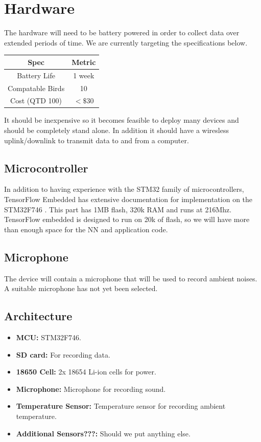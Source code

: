 \documentclass[12pt,journal,compsoc]{IEEEtran}
\begin{document}
\section{Hardware}
The hardware will need to be battery powered in order to collect data over extended periods of time. We are currently targeting the specifications below.

\begin{center}
\begin{tabular}{ c | c }
Spec             & Metric\\ 
\hline 
Battery Life     & 1 week\\
Compatable Birds & 10    \\
Cost (QTD 100)   & $<\$30$  \\
\end{tabular}
\end{center}

It should be inexpensive so it becomes feasible to deploy many devices and should be completely stand alone. In addition it should have a wiresless uplink/downlink to transmit data to and from a computer.

\subsection{Microcontroller}
In addition to having experience with the STM32 family of microcontrollers, TensorFlow Embedded \cite{TF} has extensive documentation for implementation on the STM32F746 \cite{STM}. This part has 1MB flash, 320k RAM and runs at 216Mhz. TensorFlow embedded is designed to run on 20k of flash, so we will have more than enough space for the NN and application code.

\subsection{Microphone}
The device will contain a microphone that will be used to record ambient noises. A suitable microphone has not yet been selected.

\subsection{Architecture}
\begin{itemize}
\item{\textbf{MCU:} STM32F746.}
\item{\textbf{SD card:} For recording data.}
\item{\textbf{18650 Cell:} 2x 18654 Li-ion cells for power.}
\item{\textbf{Microphone:} Microphone for recording sound.}
\item{\textbf{Temperature Sensor:} Temperature sensor for recording ambient temperature.}
\item{\textbf{Additional Sensors???:} Should we put anything else.}
\end{itemize}
\end{document}
